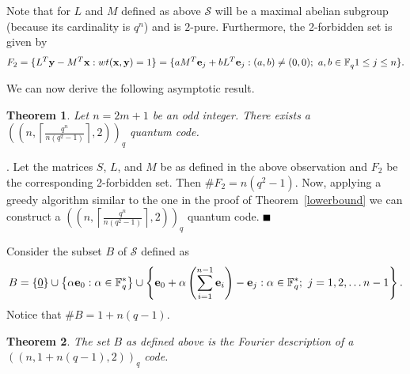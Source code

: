\documentclass{Rinton-P9x6}
\newtheorem{theorem}{Theorem}[section]
\newcommand{\GF}[2][]{{\ensuremath{\mathbb{F}_{#2}^{#1}}}}
\newcommand{\bproof}{\noindent{\it Proof}}
\newcommand{\eproof}{\hspace*{\fill}$\rule{2mm}{2mm}$~~~~~\bigskip}
\renewenvironment{proof}{\bproof. }{\eproof}
\newcommand{\e}{{\bf e}}
\newcommand{\x}{{\bf x}}
\newcommand{\y}{{\bf y}}
\renewcommand{\S}{{\ensuremath{\mathcal{S}}}}
\begin{document}
Note that for $L$ and $M$ defined as above $\S$ will be a maximal
abelian subgroup (because its cardinality is $q^n$) and is $2$-pure.
Furthermore, the 2-forbidden set is given by
\[
F_2 = \{ L^T \y - M^T \x : wt(\x,\y) = 1 \} = \{ a M^T \e_j + b L^T
\e_j : (a,b) \ne (0,0);\ a,b \in \GF{q} 1 \leq j \leq n \}.
\]
    
We can now derive the following asymptotic result.

\begin{theorem}
  Let $n = 2m +1$ be an odd integer. There exists a
  $((n,\left\lceil\frac{q^n}{n(q^2 -1)}\right\rceil,2))_q$ quantum code.
\end{theorem}

\begin{proof}
  Let the matrices $S$, $L$, and $M$ be as defined in the above
  observation and $F_2$ be the corresponding 2-forbidden set. Then
  $\#F_2 = n (q^2 - 1)$. Now, applying a greedy algorithm similar to
  the one in the proof of Theorem~\ref{lowerbound} we can construct a
  $((n,\left\lceil\frac{q^n}{n(q^2-1)}\right\rceil,2))_q$ quantum
  code.
\end{proof}

Consider the subset $B$ of $\S$ defined as
\[
B = \left\{ \underline{0} \right\} \cup \left\{ \alpha \e_0 : \alpha \in \GF[*]{q} \right\} \cup
\left\{ \e_0 + \alpha\left( \sum_{i=1}^{n-1} \e_i\right) - \e_j : \alpha \in
  \GF[*]{q};\ j = 1,2,\dots n-1 \right\}.
\]
Notice that $\# B = 1 + n(q-1)$. 

\begin{theorem}
  The set $B$ as defined above is the Fourier description of a $((n,1 + n(q-1), 2))_q$ code.
\end{theorem}
\end{document}
